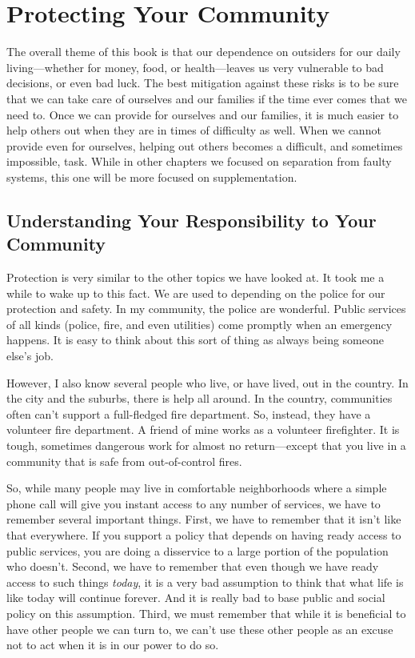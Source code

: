 \chapter{Protecting Your Community}

The overall theme of this book is that our dependence on outsiders for
our daily living—whether for money, food, or health—leaves us very
vulnerable to bad decisions, or even bad luck. The best mitigation
against these risks is
to be sure that we can take care of ourselves and our families if the
time ever comes that we need to. Once we can provide for ourselves and
our families, it is much easier to help others out when they are in
times of difficulty as well. When we cannot provide even for ourselves,
helping out others becomes a difficult, and sometimes impossible, task.
While in other chapters we focused on separation from faulty systems,
this one will be more focused on supplementation.

\section{Understanding Your Responsibility to Your Community}

Protection is very similar to the other topics we have looked at. It
took me a while to wake up to this fact. We are used to depending on
the police for our protection and safety. In my community, the police
are wonderful. Public services of all kinds (police, fire, and even
utilities) come promptly when an emergency happens. It is easy to think
about this sort of thing as always being someone else’s job. 

However, I also know several people who live, or have lived, out in the
country. In the city and the suburbs, there is help all around. In the
country, communities
often can’t support a full-fledged fire department. So, instead, they
have a volunteer fire department. A friend of mine works as a volunteer
firefighter. It is tough, sometimes dangerous work for almost no
return—except that you live in a community that is safe from
out-of-control fires.

So, while many people may live in comfortable neighborhoods where a
simple phone call will give you instant access to any number of
services, we have to remember several important things. First, we have
to remember that it isn’t like that everywhere. If you support a policy
that depends on having ready access to public services, you are doing a
disservice to a large portion of the population who doesn’t. Second, we
have to remember that even though we have ready access to such things
\textit{today}, it is a very bad assumption to think that what life is
like today will continue forever. And it is really bad to base public
and social policy on this assumption. Third, we must remember that
while it is beneficial to have other people we can turn to, we can’t
use these other people as an excuse not to act when it is in our power
to do so.

